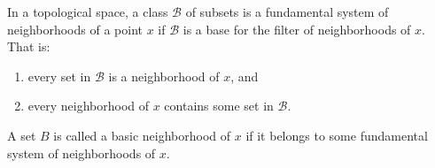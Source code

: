 In a topological space, a class $\mathcal{B}$ of subsets is a fundamental system of neighborhoods of a point $x$ if $\mathcal{B}$ is a base for the filter of neighborhoods of $x$. That is:
\begin{enumerate}
\item[(i)] every set in $\mathcal{B}$ is a neighborhood of $x$, and
\item[(ii)] every neighborhood of $x$ contains some set in $\mathcal{B}$.
\end{enumerate}
A set $B$ is called a basic neighborhood of $x$ if it belongs to some fundamental system of neighborhoods of $x$.
